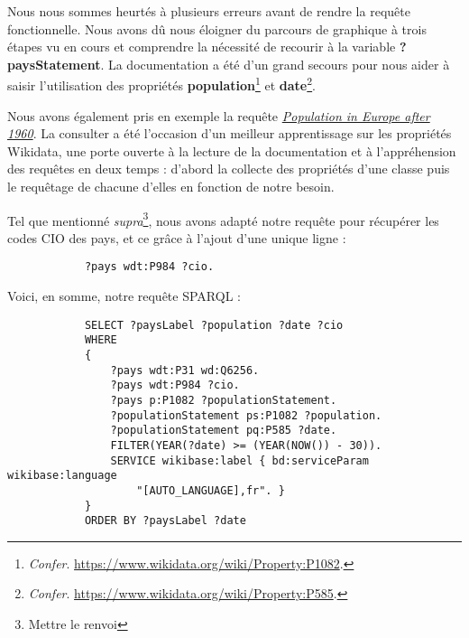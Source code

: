 \documentclass[hidelinks, 12pt]{article}
\begin{document}
		Nous nous sommes heurtés à plusieurs erreurs avant de rendre la requête fonctionnelle. Nous avons dû nous éloigner du parcours de graphique à trois étapes vu en cours et comprendre la nécessité de recourir à la variable \textbf{?paysStatement}. La documentation a été d'un grand secours pour nous aider à saisir l'utilisation des propriétés \textbf{population}\footnote{\emph{Confer}. \url{https://www.wikidata.org/wiki/Property:P1082}.} et \textbf{date}\footnote{\emph{Confer}. \url{https://www.wikidata.org/wiki/Property:P585}.}.
		
		Nous avons également pris en exemple la requête \href{https://query.wikidata.org/#%23Population%20in%20Europe%20after%201960%0ASELECT%20%20%3FobjectLabel%20%20%20%20%28YEAR%28%3Fdate%29%20as%20%3Fyear%29%0A%20%20%20%20%20%20%20%20%3Fpopulation%20%20%20%20%20%28%3FobjectLabel%20as%20%3FLocation%29%0AWHERE%0A%7B%0A%20%20%20%20%20%20%20%20wd%3AQ458%20wdt%3AP150%20%3Fobject%20.%20%20%20%23%20European%20Union%20%20contains%20administrative%20territorial%20entity%0A%20%20%20%20%20%20%20%20%3Fobject%20p%3AP1082%20%3FpopulationStatement%20.%0A%20%20%20%20%20%20%20%20%3FpopulationStatement%20%20%20%20ps%3AP1082%20%3Fpopulation%0A%20%20%20%20%20%20%20%20%3B%20pq%3AP585%20%3Fdate%20.%0A%20%20%20%20%20%20%20%20SERVICE%20wikibase%3Alabel%20%7B%20bd%3AserviceParam%20wikibase%3Alanguage%20%22%5BAUTO_LANGUAGE%5D%2Cen%22%20%7D%20%20%20%20%20%20%20%20%20%20%20%20%20%20%20%0A%20%20FILTER%20%28YEAR%28%3Fdate%29%20%3E%3D%201960%29%0A%7D%0AORDER%20BY%20%3FobjectLabel%20%3Fyear}{\emph{Population in Europe after 1960}}. La consulter a été l'occasion d'un meilleur apprentissage sur les propriétés Wikidata, une porte ouverte à la lecture de la documentation et à l'appréhension des requêtes en deux temps : d'abord la collecte des propriétés d'une classe puis le requêtage de chacune d'elles en fonction de notre besoin.
		
		Tel que mentionné \emph{supra}\footnote{Mettre le renvoi}, nous avons adapté notre requête pour récupérer les codes CIO des pays, et ce grâce à l'ajout d'une unique ligne :
		
		\begin{verbatim}
			?pays wdt:P984 ?cio.
		\end{verbatim}
		
		Voici, en somme, notre requête SPARQL :
		
		\begin{verbatim}
			SELECT ?paysLabel ?population ?date ?cio
			WHERE 
			{
				?pays wdt:P31 wd:Q6256.
				?pays wdt:P984 ?cio.
				?pays p:P1082 ?populationStatement.
				?populationStatement ps:P1082 ?population. 
				?populationStatement pq:P585 ?date.
				FILTER(YEAR(?date) >= (YEAR(NOW()) - 30)).
				SERVICE wikibase:label { bd:serviceParam wikibase:language
					"[AUTO_LANGUAGE],fr". }
			}
			ORDER BY ?paysLabel ?date
		\end{verbatim}
		
\end{document}
